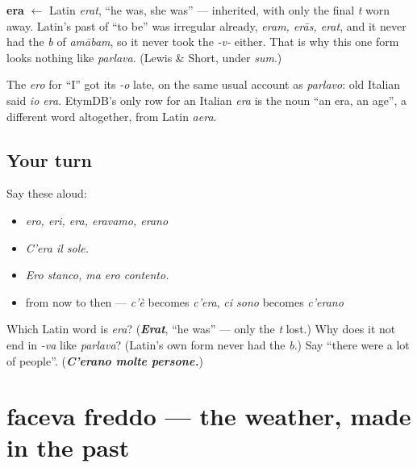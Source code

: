 \begin{cousinweb}
\textbf{era} $\leftarrow$ Latin \emph{erat}, \textquotedblleft{}he was, she was\textquotedblright{} — inherited, with only the final \emph{t} worn away. Latin's past of \textquotedblleft{}to be\textquotedblright{} was irregular already, \emph{eram, erās, erat}, and it never had the \emph{b} of \emph{amābam}, so it never took the \emph{-v-} either. That is why this one form looks nothing like \emph{parlava}. (Lewis \& Short, under \emph{sum}.)

The \emph{ero} for \textquotedblleft{}I\textquotedblright{} got its \emph{-o} late, on the same usual account as \emph{parlavo}: old Italian said \emph{io era}. EtymDB's only row for an Italian \emph{era} is the noun \textquotedblleft{}an era, an age\textquotedblright{}, a different word altogether, from Latin \emph{aera}.
\end{cousinweb}

\subsection*{Your turn}
Say these aloud:

\begin{itemize}
\raggedright
  \item \emph{ero, eri, era, eravamo, erano}
  \item \emph{C'era il sole.}
  \item \emph{Ero stanco, ma ero contento.}
  \item from now to then — \emph{c'è} becomes \emph{c'era}, \emph{ci sono} becomes \emph{c'erano}
\end{itemize}

\begin{tcolorbox}[breakable,colback=teal!4,colframe=teal!35!black,title={Before you move on}]
Which Latin word is \emph{era}? (\emph{\textbf{Erat}}, \textquotedblleft{}he was\textquotedblright{} — only the \emph{t} lost.) Why does it not end in \emph{-va} like \emph{parlava}? (Latin's own form never had the \emph{b}.) Say \textquotedblleft{}there were a lot of people\textquotedblright{}. (\emph{\textbf{C'erano molte persone.}})
\end{tcolorbox}
\section[faceva freddo, faceva caldo]{faceva freddo — the weather, made in the past}

\label{lesson:IT-C263-faceva}



